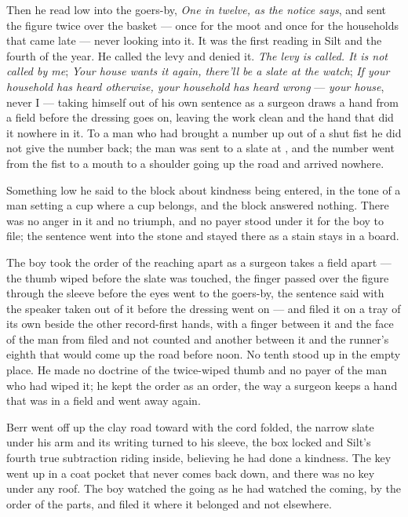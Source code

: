 Then he read low into the goers-by, \emph{One in twelve, as the notice says}, and sent the figure twice over the basket --- once for the moot and once for the households that came late --- never looking into it. It was the first reading in Silt and the fourth of the year. He called the levy and denied it. \emph{The levy is called. It is not called by me}; \emph{Your house wants it again, there'll be a slate at the watch}; \emph{If your household has heard otherwise, your household has heard wrong} --- \emph{your house}, never I --- taking himself out of his own sentence as a surgeon draws a hand from a field before the dressing goes on, leaving the work clean and the hand that did it nowhere in it. To a man who had brought a number up out of a shut fist he did not give the number back; the man was sent to a slate at , and the number went from the fist to a mouth to a shoulder going up the road and arrived nowhere.

Something low he said to the block about kindness being entered, in the tone of a man setting a cup where a cup belongs, and the block answered nothing. There was no anger in it and no triumph, and no payer stood under it for the boy to file; the sentence went into the stone and stayed there as a stain stays in a board.

The boy took the order of the reaching apart as a surgeon takes a field apart --- the thumb wiped before the slate was touched, the finger passed over the figure through the sleeve before the eyes went to the goers-by, the sentence said with the speaker taken out of it before the dressing went on --- and filed it on a tray of its own beside the other record-first hands, with a finger between it and the face of the man from  filed and not counted and another between it and the runner's eighth that would come up the road before noon. No tenth stood up in the empty place. He made no doctrine of the twice-wiped thumb and no payer of the man who had wiped it; he kept the order as an order, the way a surgeon keeps a hand that was in a field and went away again.

Berr went off up the clay road toward  with the cord folded, the narrow slate under his arm and its writing turned to his sleeve, the box locked and Silt's fourth true subtraction riding inside, believing he had done a kindness. The key went up in a coat pocket that never comes back down, and there was no key under any roof. The boy watched the going as he had watched the coming, by the order of the parts, and filed it where it belonged and not elsewhere.

